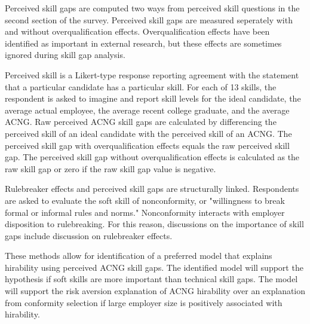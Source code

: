 \documentclass[review]{elsarticle}
\begin{document}
Perceived skill gaps are computed two ways from perceived skill questions in the second section of the survey.
Perceived skill gaps are measured seperately with and without overqualification effects.
Overqualification effects have been identified as important in external research\cite{green2007there, raybould2005over}, but these effects are sometimes ignored during skill gap analysis\cite{blake_2018}.

Perceived skill is a Likert-type response reporting agreement with the statement that a particular candidate has a particular skill.
For each of 13 skills, the respondent is asked to imagine and report skill levels for the ideal candidate,
the average actual employee,
the average recent college graduate,
and the average ACNG.
Raw perceived ACNG skill gaps are calculated by differencing the perceived skill of an ideal candidate with the perceived skill of an ACNG.
The perceived skill gap with overqualification effects equals the raw perceived skill gap.
The perceived skill gap without overqualification effects is calculated as the raw skill gap or zero if the raw skill gap value is negative.

Rulebreaker effects and perceived skill gaps are structurally linked.
Respondents are asked to evaluate the soft skill of nonconformity, or "willingness to break formal or informal rules and norms."
Nonconformity interacts with employer disposition to rulebreaking.
For this reason, discussions on the importance of skill gaps include discussion on rulebreaker effects.


These methods allow for identification of a preferred model that explains hirability using perceived ACNG skill gaps.
The identified model will support the hypothesis if soft skills are more important than technical skill gaps. %
The model will support the risk aversion explanation of ACNG hirability over an explanation from conformity selection if large employer size is positively associated with hirability.
\end{document}

